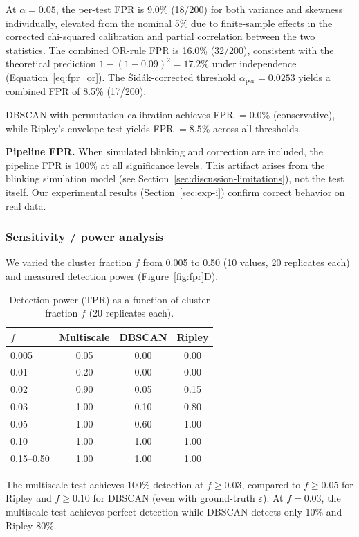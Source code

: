 \documentclass[11pt]{article}
\begin{document}
At $\alpha = 0.05$, the per-test FPR is 9.0\% (18/200) for both
variance and skewness individually, elevated from the nominal 5\% due
to finite-sample effects in the corrected chi-squared calibration and
partial correlation between the two statistics. The combined OR-rule FPR
is 16.0\% (32/200), consistent with the theoretical prediction
$1 - (1 - 0.09)^2 = 17.2\%$ under independence
(Equation~\ref{eq:fpr_or}). The \v{S}id\'ak-corrected threshold
$\alpha_\mathrm{per} = 0.0253$ yields a combined FPR of 8.5\% (17/200).

DBSCAN with permutation calibration achieves FPR $= 0.0\%$
(conservative), while Ripley's envelope test yields FPR $= 8.5\%$ across
all thresholds.

\textbf{Pipeline FPR.} When simulated blinking and correction are
included, the pipeline FPR is 100\% at all significance levels. This
artifact arises from the blinking simulation model (see
Section~\ref{sec:discussion-limitations}), not the test itself. Our
experimental results (Section~\ref{sec:exp-i}) confirm correct behavior
on real data.

\subsubsection{Sensitivity / power analysis}
\label{sec:exp-b}

We varied the cluster fraction $f$ from 0.005 to 0.50 (10 values, 20
replicates each) and measured detection power
(Figure~\ref{fig:fpr}D).

\begin{table}[ht]
\centering
\caption{Detection power (TPR) as a function of cluster fraction $f$
  (20 replicates each).}
\label{tab:sensitivity}
\begin{tabular}{lccc}
\toprule
$f$ & Multiscale & DBSCAN & Ripley \\
\midrule
0.005 & 0.05 & 0.00 & 0.00 \\
0.01  & 0.20 & 0.00 & 0.00 \\
0.02  & 0.90 & 0.05 & 0.15 \\
0.03  & 1.00 & 0.10 & 0.80 \\
0.05  & 1.00 & 0.60 & 1.00 \\
0.10  & 1.00 & 1.00 & 1.00 \\
0.15--0.50 & 1.00 & 1.00 & 1.00 \\
\bottomrule
\end{tabular}
\end{table}

The multiscale test achieves 100\% detection at $f \geq 0.03$, compared
to $f \geq 0.05$ for Ripley and $f \geq 0.10$ for DBSCAN (even with
ground-truth $\varepsilon$). At $f = 0.03$, the multiscale test achieves
perfect detection while DBSCAN detects only 10\% and Ripley 80\%.
\end{document}
